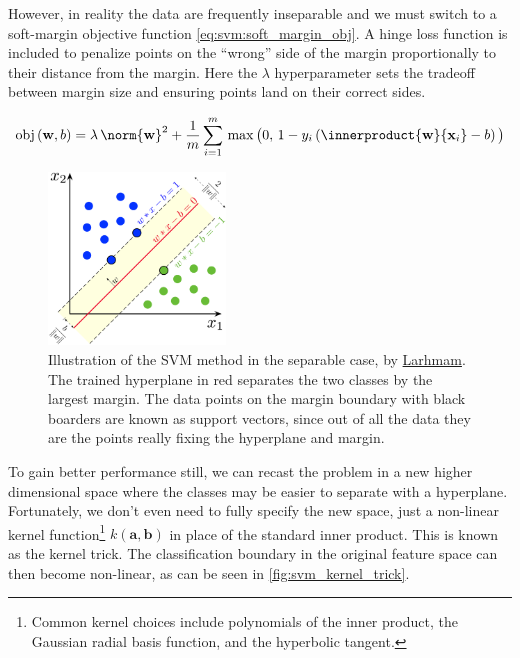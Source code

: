 However, in reality the data are frequently inseparable and we must switch
to a soft-margin objective function \cref{eq:svm:soft_margin_obj}.
A hinge loss function is included to penalize points on the ``wrong'' side of the margin
proportionally to their distance from the margin.
Here the $\lambda$ hyperparameter sets the tradeoff between
margin size and ensuring points land on their correct sides.

\begin{equation} \label{eq:svm:soft_margin_obj}
\text{obj}\left(\mathbf{w}, b\right) =
\lambda\, \norm{\mathbf{w}}^{2}
+ \frac{1}{m} \sum_{i=1}^{m} \,
\max{\big(0,\, 1 - y_{i} \left(\innerproduct{\mathbf{w}}{\mathbf{x}_{i}} - b\right)\big)}
\end{equation}

\begin{figure}[H]
\centering
\includegraphics[width=0.42\textwidth]{figures/ml/svm_margin.png}
\vspace{0.2cm}
\caption{
Illustration of the SVM method in the separable case,
by \href{https://en.wikipedia.org/wiki/File:SVM_margin.png}{Larhmam}.
The trained hyperplane in red separates the two classes by the largest margin.
The data points on the margin boundary with black boarders
are known as support vectors, since out of all the data
they are the points really fixing the hyperplane and margin.
}
\label{fig:svm_sep}
\end{figure}

To gain better performance still, we can recast the problem in
a new higher dimensional space where the classes may be easier to separate with a hyperplane.
Fortunately, we don't even need to fully specify the new space,
just a non-linear kernel function\footnote{Common kernel choices include
polynomials of the inner product,
the Gaussian radial basis function,
and the hyperbolic tangent.} $k\left(\mathbf{a},\mathbf{b}\right)$
in place of the standard inner product. This is known as the kernel trick.
The classification boundary in the original feature space can then become non-linear,
as can be seen in \cref{fig:svm_kernel_trick}.

